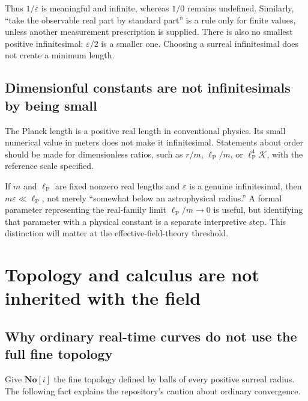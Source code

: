 \documentclass[11pt,a4paper]{article}
\numberwithin{equation}{section}
\theoremstyle{definition}
\theoremstyle{remark}
\newcommand{\No}{\mathbf{No}}
\newcommand{\SC}{\No[i]}
\newcommand{\eps}{\varepsilon}
\newcommand{\lp}{\ell_{\mathrm P}}
\newcommand{\Krets}{\mathcal K}
\begin{document}
Thus $1/\eps$ is meaningful and infinite, whereas $1/0$ remains undefined. Similarly, ``take the observable real part by standard part'' is a rule only for finite values, unless another measurement prescription is supplied. There is also no smallest positive infinitesimal: $\eps/2$ is a smaller one. Choosing a surreal infinitesimal does not create a minimum length.

\subsection{Dimensionful constants are not infinitesimals by being small}
The Planck length is a positive real length in conventional physics. Its small numerical value in meters does not make it infinitesimal. Statements about order should be made for dimensionless ratios, such as $r/m$, $\lp/m$, or $\lp^4\Krets$, with the reference scale specified.

If $m$ and $\lp$ are fixed nonzero real lengths and $\eps$ is a genuine infinitesimal, then $m\eps\ll\lp$, not merely ``somewhat below an astrophysical radius.'' A formal parameter representing the real-family limit $\lp/m\to0$ is useful, but identifying that parameter with a physical constant is a separate interpretive step. This distinction will matter at the effective-field-theory threshold.

\section{Topology and calculus are not inherited with the field}
\label{sec:calculus}

\subsection{Why ordinary real-time curves do not use the full fine topology}
Give $\SC$ the fine topology defined by balls of every positive surreal radius. The following fact explains the repository's caution about ordinary convergence.
\end{document}
